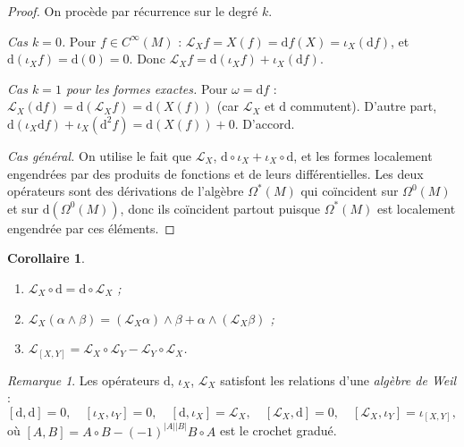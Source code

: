 \documentclass[12pt,a4paper,openany]{book}
\theoremstyle{definition}
\theoremstyle{plain}
\newtheorem{corollaire}[definition]{Corollaire}
\theoremstyle{remark}
\newtheorem{remarque}[definition]{Remarque}
\newcommand{\dd}{\mathrm{d}}
\begin{document}
\begin{proof}
On procède par récurrence sur le degré $k$.

\emph{Cas $k = 0$.} Pour $f \in C^\infty(M)$ :
$\mathcal{L}_X f = X(f) = \dd f(X) = \iota_X(\dd f)$,
et $\dd(\iota_X f) = \dd(0) = 0$. Donc
$\mathcal{L}_X f = \dd(\iota_X f) + \iota_X(\dd f)$.

\emph{Cas $k = 1$ pour les formes exactes.}
Pour $\omega = \dd f$ :
$\mathcal{L}_X(\dd f) = \dd(\mathcal{L}_X f) = \dd(X(f))$
(car $\mathcal{L}_X$ et $\dd$ commutent). D'autre part,
$\dd(\iota_X \dd f) + \iota_X(\dd^2 f) = \dd(X(f)) + 0$. D'accord.

\emph{Cas général.}
On utilise le fait que $\mathcal{L}_X$, $\dd \circ \iota_X + \iota_X
\circ \dd$, et les formes localement engendrées par des produits de
fonctions et de leurs différentielles. Les deux opérateurs sont des
dérivations de l'algèbre $\Omega^*(M)$ qui coïncident sur $\Omega^0(M)$
et sur $\dd(\Omega^0(M))$, donc ils coïncident partout puisque
$\Omega^*(M)$ est localement engendrée par ces éléments.
\end{proof}

\begin{corollaire}\label{cor:lie-proprietes}
\begin{enumerate}[label=\textup{(\roman*)}]
  \item $\mathcal{L}_X \circ \dd = \dd \circ \mathcal{L}_X$ ;
  \item $\mathcal{L}_X(\alpha \wedge \beta) =
    (\mathcal{L}_X \alpha) \wedge \beta +
    \alpha \wedge (\mathcal{L}_X \beta)$ ;
  \item $\mathcal{L}_{[X,Y]} = \mathcal{L}_X \circ \mathcal{L}_Y -
    \mathcal{L}_Y \circ \mathcal{L}_X$.
\end{enumerate}
\end{corollaire}

\begin{remarque}\label{rem:algebre-derivations}
Les opérateurs $\dd$, $\iota_X$, $\mathcal{L}_X$ satisfont les relations
d'une \emph{algèbre de Weil} :
\[
  [\dd, \dd] = 0, \quad [\iota_X, \iota_Y] = 0, \quad
  [\dd, \iota_X] = \mathcal{L}_X, \quad
  [\mathcal{L}_X, \dd] = 0, \quad
  [\mathcal{L}_X, \iota_Y] = \iota_{[X,Y]},
\]
où $[A, B] = A \circ B - (-1)^{|A||B|} B \circ A$ est le crochet gradué.
\end{remarque}
\end{document}
